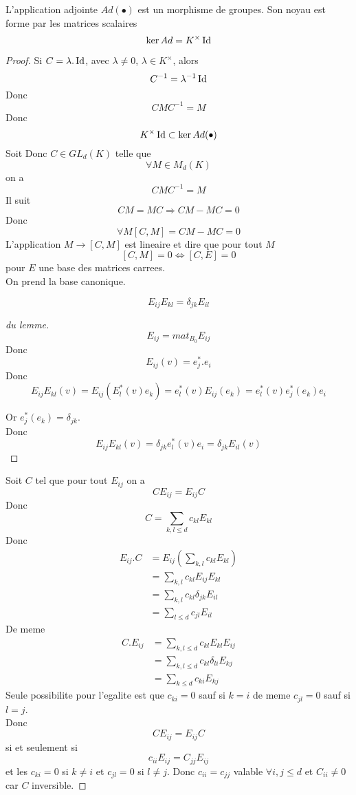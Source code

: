 \documentclass[../main.tex]{subfiles}
\begin{document}
\begin{propo}
	L'application adjointe $Ad( \bullet) $ est un morphisme de groupes. Son noyau est forme par les matrices scalaires
	\[ 
	\ker Ad = K^{\times}\operatorname*{Id}
	\]
	
\end{propo}
\begin{proof}
Si $C= \lambda.\operatorname*{Id}$, avec $\lambda\neq 0$, $\lambda\in K^{\times}$, alors
\[ 
C^{-1} = \lambda^{-1}\operatorname*{Id}
\]
Donc
\[ 
CMC^{-1}= M
\]
Donc
\[ 
	K^{\times}\operatorname*{Id} \subset \ker Ad( \bullet) 
\]
Soit Donc $C \in GL_d( K) $ telle que
\[ 
	\forall M \in M_d( K) 
\]
on a
\[ 
CMC^{-1}= M
\]
Il suit
\[ 
	CM = MC \Rightarrow CM-MC = 0
\]
Donc
\[ 
	\forall M [ C,M] = CM-MC = 0
\]
L'application $M\to [ C,M]$ est lineaire et dire que pour tout $M$ 
\[ 
[ C,M] = 0 \iff [ C,E] =0
\]
pour $E$ une base des matrices carrees.\\
On prend la base canonique.\\
\begin{lemma}
\[ 
E_{ij} E_{kl} = \delta_{j k} E_{il} 
\]
\end{lemma}
\begin{proof}[du lemme]
	\[ 
	E_{ij} = mat_{B_0} E_{ij} 
	\]
	Donc
	\[ 
		E_{ij} ( v) = e_j^{*}. e_i
	\]
	Donc 
	\[ 
		E_{ij} E_{kl} ( v) = E_{ij} ( E_l^{*}( v) e_k) = e_l^{*}( v) E_{ij} ( e_k)  = e_l^{*}( v) e_j^{*}( e_k) e_i
	\]
	


	Or $e_{j}^{*}( e_k)  = \delta_{jk} $.\\
	Donc
	\[ 
		E_{ij} E_{kl} ( v) = \delta _{j k} e_{l} ^{*}( v) e_i = \delta _{jk} E_{il} ( v) 
	\]
	

\end{proof}
Soit $C$ tel que pour tout $E_{ij} $ on a 
\[ 
C E_{ij}  = E_{ij} C
\]
Donc
\[ 
C = \sum_{k,l\leq d} c_{kl} E_{kl} 
\]
Donc
\begin{align*}
	E_{ij} . C &= E_{ij} ( \sum_{k,l} c_{kl} E_{kl} ) \\
		   &= \sum_{k,l} c_{kl} E_{ij} E_{kl}\\
		   &= \sum_{k,l} c_{kl} \delta_{jk} E_{il} \\
		   &= \sum_{l\leq d} c_{jl} E_{il} 
\end{align*}
De meme
\begin{align*}
	C. E_{ij} &= \sum_{k,l\leq d} c_{kl} E_{kl} E_{ij}\\
                  &= \sum_{k,l\leq d } c_{kl} \delta_{li} E_{kj}\\
		  &= \sum_{k\leq d} c_{ki} E_{kj} 
\end{align*}
Seule possibilite pour l'egalite est que $c_{ki} = 0$ sauf si $k=i$ de meme $c_{jl} =0$ sauf si $l=j$.\\
Donc 
\[ 
CE_{ij} = E_{ij} C
\]
si et seulement si
\[ 
c_{ii} E_{ij} = C_{jj} E_{ij} 
\]
et les $c_{ki} = 0$ si $k\neq i$ et $c_{jl} =0$ si $l\neq j$.
Donc $c_{ii} = c_{jj} $ valable $\forall i,j \leq d$ et $C_{ii} \neq 0$ car $C$ inversible.
\end{proof}
\end{document}
